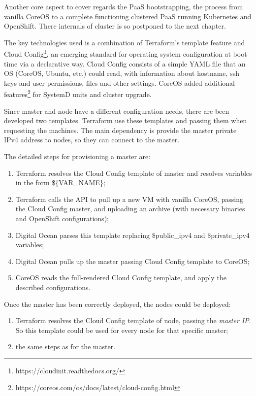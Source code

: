 Another core aspect to cover regards the PaaS bootstrapping, the process from vanilla CoreOS to a complete functioning clustered PaaS running Kubernetes and OpenShift.  There internals of cluster is so postponed to the next chapter.

The key technologies used is a combination of Terraform's template feature and Cloud Config\footnote{https://cloudinit.readthedocs.org/}, an emerging standard for operating system configuration at boot time via a declarative way.  Cloud Config consists of a simple YAML file that an OS (CoreOS, Ubuntu, etc.) could read, with information about hostname, ssh keys and user permissions, files and other settings.  CoreOS added additional features\footnote{https://coreos.com/os/docs/latest/cloud-config.html} for SystemD units and cluster upgrade.

Since master and node have a different configuration needs, there are been developed two templates.  Terraform use these templates and passing them when requesting the machines. The main dependency is provide the master private IPv4 address to nodes, so they can connect to the master.

The detailed steps for provisioning a master are:
\begin{enumerate}
\item Terraform resolves the Cloud Config template of master and resolves variables in the form \$\{VAR\_NAME\};
\item Terraform calls the API to pull up a new VM with vanilla CoreOS, passing the Cloud Config master, and uploading an archive (with necessary binaries and OpenShift configurations);
\item Digital Ocean parses this template replacing \$public\_ipv4 and \$private\_ipv4 variables;
\item Digital Ocean pulls up the master passing Cloud Config template to CoreOS;
\item CoreOS reads the full-rendered Cloud Config template, and apply the described configurations.
\end{enumerate}

Once the master has been correctly deployed, the nodes could be deployed:
\begin{enumerate}
\item Terraform resolves the Cloud Config template of node, passing the \textit{master IP}.  So this template could be used for every node for that specific master;
\item the same steps as for the master.
\end{enumerate}

